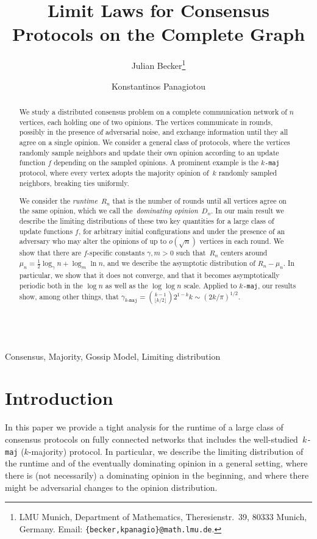 \documentclass[11pt]{article}
\title{Limit Laws for Consensus Protocols on the Complete Graph 
}
\author{Julian Becker\thanks{LMU Munich, Department of Mathematics, Theresienstr.~39, 80333 Munich, Germany. Email: \texttt{\{becker,kpanagio\}@math.lmu.de}.} \and Konstantinos Panagiotou\footnotemark[1]
}
\numberwithin{theorem}{section}
\begin{document}
\maketitle

\begin{abstract}
We study a distributed consensus problem on a complete communication network of 
$n$ vertices, each holding one of two opinions. The vertices communicate in rounds, possibly in the presence of adversarial noise, and exchange information until they all agree on a single opinion. We consider a general class of protocols, where the vertices randomly sample neighbors and update their own opinion according to an update function $f$ depending on the sampled opinions. A prominent example is the \texttt{$k$-maj} protocol, where every vertex adopts the majority opinion of~$k$ randomly sampled neighbors, breaking ties uniformly.

We consider the \textit{runtime}~$R_n$ that is the number of rounds until all vertices agree on the same opinion, which we call the~\emph{dominating opinion}~$D_n$.
In our main result we describe the limiting distributions of these two key quantities for a large class of update functions $f$, for arbitrary initial configurations and under the presence of an adversary who may alter the opinions of up to $o(\sqrt{n})$ vertices in each round.
We show that there are $f$-specific constants $\gamma, m > 0$ such that~$R_n$ centers around $\mu_n = \frac{1}{2}\log_\gamma n + \log_m\ln n$, and we describe the asymptotic distribution of $R_n - \mu_n$. In particular, we show that it does not converge, and that it becomes asymptotically periodic both in the $\log n$ as well as the $\log\log n$ scale. Applied to
\texttt{$k$-maj}, our results show, among other things, that $\gamma_{\texttt{$k$-maj}} = \binom{k-1}{\lfloor k/2 \rfloor}2^{1-k}k \sim ({2k}/{\pi})^{1/2}$.
\end{abstract}


~\\
 Consensus, Majority, Gossip Model, Limiting distribution


\section{Introduction}


In this paper we provide a tight analysis for the runtime of a large class of consensus protocols on fully connected networks that includes the well-studied~\texttt{$k$-maj} ($k$-majority) protocol. In particular, we describe the limiting distribution of the runtime and of the eventually dominating opinion in a general setting, where there is (not necessarily) a dominating opinion in the beginning, and where there might be adversarial changes to the opinion distribution.
\end{document}
